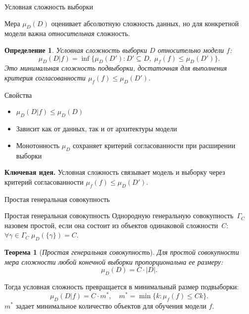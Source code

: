 \documentclass[10pt,pdf,hyperref={unicode}]{beamer}
\newtheorem{rustheorem}{Теорема}
\newtheorem{rusdefinition}{Определение}
\newcommand{\key}[1]{\textbf{\color{darkgreen}#1}}
\begin{document}
\begin{frame}{Условная сложность выборки}
\justifying
\small

Мера $\mu_D(D)$ оценивает абсолютную сложность данных, но для конкретной модели важна \textit{относительная} сложность.

\begin{rusdefinition}
    \justifying
    Условная сложность выборки $D$ относительно модели $f$:
    \[
        \mu_D(D|f) = \inf\{\mu_D(D'): D'\subseteq D,\; \mu_f(f) \le \mu_D(D')\}.
    \]
    Это минимальная сложность подвыборки, достаточная для выполнения критерия согласованности $\mu_f(f)\le\mu_D(D')$.
\end{rusdefinition}

\vspace{0.1cm}
\begin{block}{Свойства}
    \begin{itemize}
        \item $\mu_D(D|f) \le \mu_D(D)$
        \item Зависит как от данных, так и от архитектуры модели
        \item Монотонность $\mu_D$ сохраняет критерий согласованности при расширении выборки
    \end{itemize}
\end{block}

\vspace{0.15em}
\key{Ключевая идея.} Условная сложность связывает модель и выборку через критерий согласованности $\mu_f(f)\le\mu_D(D')$.
\end{frame}
\begin{frame}{Простая генеральная совокупность}
\justifying

\begin{block}{Простая генеральная совокупность}
\justifying
Однородную генеральную совокупность~$\Gamma_C$ назовем простой, если она состоит из объектов одинаковой сложности~$C$: $\forall \gamma\in\Gamma_C\; \mu_D(\{\gamma\}) = C$.

\begin{rustheorem}[\emph{Простая генеральная совокупность}]
    Для простой совокупности мера сложности любой конечной выборки пропорциональна ее размеру:
    \[
        \mu_D(D) = C\cdot|D|.
    \]
\end{rustheorem}

Тогда условная сложность превращается в минимальный размер подвыборки:
\[
    \mu_D(D|f) = C\cdot m^*, \quad m^* = \min\{k: \mu_f(f) \le Ck\}.
\]
$m^*$ задает минимальное количество объектов для обучения модели $f$.
\end{block}
\end{frame}
\end{document}
